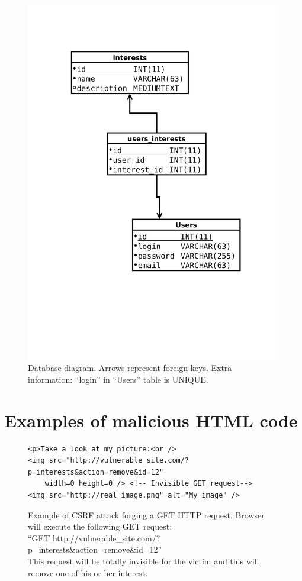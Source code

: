 \documentclass[a4paper,11pt,openany]{report}
\begin{document}
\begin{figure}[h!t]
  \includegraphics[trim=0 200 0 110,clip,width=\textwidth]{database.pdf}
  \caption{Database diagram. Arrows represent foreign keys. Extra information: ``login'' in ``Users'' table is UNIQUE.}
  \label{figure:database}
\end{figure}
  
\chapter{Examples of malicious HTML code} \label{app:csrf_attack}

\begin{figure}[h!t]
  \begin{verbatim}
<p>Take a look at my picture:<br />
<img src="http://vulnerable_site.com/?p=interests&action=remove&id=12" 
    width=0 height=0 /> <!-- Invisible GET request-->
<img src="http://real_image.png" alt="My image" />
  \end{verbatim}
  \caption{%
  Example of CSRF attack forging a GET HTTP request. Browser will execute the following GET request:\\
  ``GET http://vulnerable\_site.com/?p=interests\&action=remove\&id=12''\\
  This request will be totally invisible for the victim and this will remove one of his or her interest.
  }
  \label{figure:get_request}
\end{figure}
\end{document}
